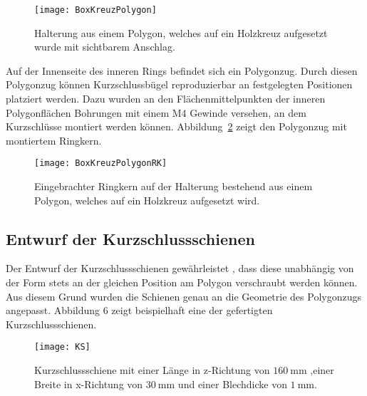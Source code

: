 \begin{figure}[htb]
	\centering
	\texttt{[image: BoxKreuzPolygon]}
	\caption{Halterung aus einem Polygon, welches auf ein Holzkreuz aufgesetzt wurde mit sichtbarem Anschlag.}
	\label{fig:BoxKreuzPolygon}
\end{figure}

Auf der Innenseite des inneren Rings befindet sich ein Polygonzug. Durch diesen Polygonzug k\"onnen Kurzschlussb\"ugel reproduzierbar an festgelegten Positionen platziert werden. Dazu wurden an den Fl\"achenmittelpunkten der inneren Polygonfl\"achen Bohrungen mit einem M4 Gewinde versehen, an dem Kurzschl\"usse montiert werden k\"onnen. Abbildung~\ref{fig:BoxKreuzPolygonRK} zeigt den Polygonzug mit montiertem Ringkern.

\begin{figure}[htb]
	\centering
	\texttt{[image: BoxKreuzPolygonRK]}
	\caption{Eingebrachter Ringkern auf der Halterung bestehend aus einem Polygon, welches auf ein Holzkreuz aufgesetzt wird.}
	\label{fig:BoxKreuzPolygonRK}
\end{figure}






\subsection{Entwurf der Kurzschlussschienen}
\label{sec:shorts}
Der Entwurf der Kurzschlussschienen gew\"ahrleistet , dass diese unabh\"angig von der Form stets an der gleichen Position am Polygon verschraubt werden k\"onnen. Aus diesem Grund wurden die Schienen genau an die Geometrie des Polygonzugs angepasst. Abbildung 6 zeigt beispielhaft eine der gefertigten Kurzschlussschienen.
\begin{figure}[htb]
	\centering
	\texttt{[image: KS]}
	\caption{Kurzschlussschiene mit einer Länge in z-Richtung von $\SI{160}{\milli\meter}$ ,einer Breite in x-Richtung von $\SI{30}{\milli\meter}$ und einer Blechdicke von $\SI{1}{\milli\meter}$.}
	\label{fig:TZKS}
\end{figure}

